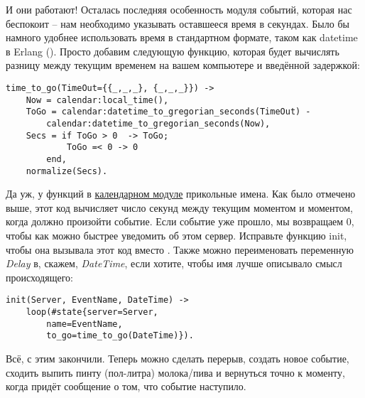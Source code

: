 И они работают!
Осталась последняя особенность модуля событий, которая нас беспокоит \--- нам необходимо указывать оставшееся время в секундах.
Было бы намного удобнее использовать время в стандартном формате, таком как datetime в Erlang ().
Просто добавим следующую функцию, которая будет вычислять разницу между текущим временем на вашем компьютере и введённой задержкой:
\begin{lstlisting}[style=erlang]
time_to_go(TimeOut={{_,_,_}, {_,_,_}}) ->
    Now = calendar:local_time(),
    ToGo = calendar:datetime_to_gregorian_seconds(TimeOut) -
        calendar:datetime_to_gregorian_seconds(Now),
    Secs = if ToGo > 0  -> ToGo;
            ToGo =< 0 -> 0
        end,
    normalize(Secs).
\end{lstlisting}

Да уж, у функций в \href{http://erldocs.com/R15B/stdlib/calendar.html}{календарном модуле} прикольные имена.
Как было отмечено выше, этот код вычисляет число секунд между текущим моментом и моментом, когда должно произойти событие.
Если событие уже прошло, мы возвращаем 0, чтобы как можно быстрее уведомить об этом сервер.
Исправьте функцию init, чтобы она вызывала этот код вместо .
Также можно переименовать переменную \emph{Delay} в, скажем, \emph{DateTime}, если хотите, чтобы имя лучше описывало смысл происходящего:
\begin{lstlisting}[style=erlang]
init(Server, EventName, DateTime) ->
    loop(#state{server=Server,
        name=EventName,
        to_go=time_to_go(DateTime)}).
\end{lstlisting}

Всё, с этим закончили.
Теперь можно сделать перерыв, создать новое событие, сходить выпить пинту (пол\--литра) молока/пива и вернуться точно к моменту, когда придёт сообщение о том, что событие наступило.
